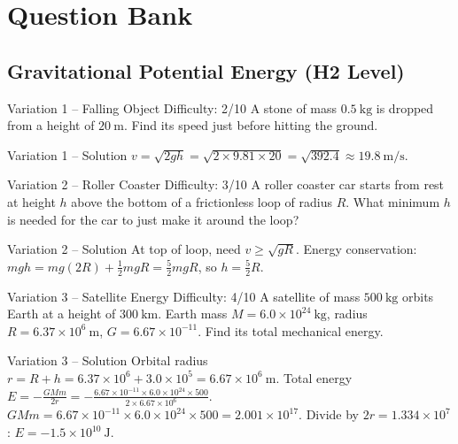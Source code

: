 \documentclass[11pt]{beamer}
\begin{document}
\section{Question Bank}

\subsection{Gravitational Potential Energy (H2 Level)}

\begin{frame}[shrink=15]{Variation 1 – Falling Object \hfill Difficulty: 2/10}
A stone of mass $0.5\ \mathrm{kg}$ is dropped from a height of $20\ \mathrm{m}$. Find its speed just before hitting the ground.
\end{frame}

\begin{frame}{Variation 1 – Solution}
$v = \sqrt{2gh} = \sqrt{2\times9.81\times20} = \sqrt{392.4} \approx 19.8\ \mathrm{m/s}$.
\end{frame}

\begin{frame}[shrink=15]{Variation 2 – Roller Coaster \hfill Difficulty: 3/10}
A roller coaster car starts from rest at height $h$ above the bottom of a frictionless loop of radius $R$. What minimum $h$ is needed for the car to just make it around the loop?
\end{frame}

\begin{frame}{Variation 2 – Solution}
At top of loop, need $v \ge \sqrt{gR}$. Energy conservation: $mgh = mg(2R) + \frac12 m gR = \frac52 mgR$, so $h = \frac52 R$.
\end{frame}

\begin{frame}[shrink=15]{Variation 3 – Satellite Energy \hfill Difficulty: 4/10}
A satellite of mass $500\ \mathrm{kg}$ orbits Earth at a height of $300\ \mathrm{km}$. Earth mass $M = 6.0\times10^{24}\ \mathrm{kg}$, radius $R = 6.37\times10^6\ \mathrm{m}$, $G = 6.67\times10^{-11}$. Find its total mechanical energy.
\end{frame}

\begin{frame}{Variation 3 – Solution}
Orbital radius $r = R + h = 6.37\times10^6 + 3.0\times10^5 = 6.67\times10^6\ \mathrm{m}$.
Total energy $E = -\frac{GMm}{2r} = -\frac{6.67\times10^{-11}\times6.0\times10^{24}\times500}{2\times6.67\times10^6}$.
$GMm = 6.67\times10^{-11}\times6.0\times10^{24}\times500 = 2.001\times10^{17}$.
Divide by $2r = 1.334\times10^7$: $E = -1.5\times10^{10}\ \mathrm{J}$.
\end{frame}
\end{document}
